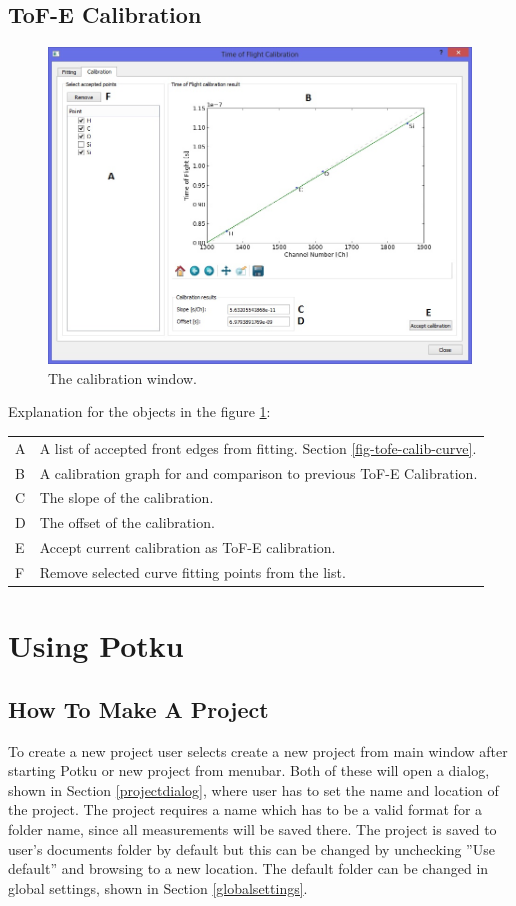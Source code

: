 \documentclass{scrreprt}
\begin{document}
\section{ToF-E Calibration}\label{measurement-tofe-calib-linear}
\begin{figure}[H]
\centering
\includegraphics[width=140mm]{measurement-tofe-calib-linear}
\caption{The calibration window.}
\label{fig-tofe-calib-linear}
\end{figure}
Explanation for the objects in the figure \ref{fig-tofe-calib-linear}:

\begin{tabular}{ll}
A & A list of accepted front edges from fitting. Section \ref{fig-tofe-calib-curve}.\\
B & A calibration graph for and comparison to previous ToF-E Calibration.\\
C & The slope of the calibration.\\
D & The offset of the calibration.\\
E & Accept current calibration as ToF-E calibration.\\
F & Remove selected curve fitting points from the list.\\
\end{tabular}


\chapter{Using Potku}
\section{How To Make A Project}\label{howto-project}
To create a new project user selects create a new project from main window after starting Potku or new project from menubar. 
Both of these will open a dialog, shown in Section \ref{projectdialog}, where user has to set the name and location of the project.
The project requires a name which has to be a valid format for a folder name, since all measurements will be saved there.
The project is saved to user's documents folder by default but this can be changed by unchecking ''Use default'' and browsing to a new location.
The default folder can be changed in global settings, shown in Section \ref{globalsettings}.
\end{document}
